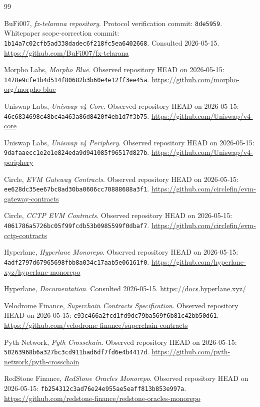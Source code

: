 \documentclass[11pt]{article}
\newcommand{\commithead}{\texttt{8de5959}}
\begin{document}
\begin{thebibliography}{99}

BuFi007, \textit{fx-telarana repository}. Protocol verification commit:
\commithead{}. Whitepaper scope-correction commit:
\texttt{1b14a7c02cfb5ad338dadec6f218fc5ea6402668}. Consulted 2026-05-15.
\url{https://github.com/BuFi007/fx-telarana}

Morpho Labs, \textit{Morpho Blue}. Observed repository HEAD on 2026-05-15:
\texttt{1478e9cfe1b4d514f80682b3b60e4e12ff3ee45a}.
\url{https://github.com/morpho-org/morpho-blue}

Uniswap Labs, \textit{Uniswap v4 Core}. Observed repository HEAD on
2026-05-15: \texttt{46c6834698c48bc4a463a86d8420f4eb1d7f3b75}.
\url{https://github.com/Uniswap/v4-core}

Uniswap Labs, \textit{Uniswap v4 Periphery}. Observed repository HEAD on
2026-05-15: \texttt{9dafaaecc1e2e1e824eda9d941085f96517d827b}.
\url{https://github.com/Uniswap/v4-periphery}

Circle, \textit{EVM Gateway Contracts}. Observed repository HEAD on
2026-05-15: \texttt{ee628dc35ee67bc8ad30ba0606cc70888688a3f1}.
\url{https://github.com/circlefin/evm-gateway-contracts}

Circle, \textit{CCTP EVM Contracts}. Observed repository HEAD on 2026-05-15:
\texttt{4061786a5726bc05f99fcdb53b0985599f0dbaf7}.
\url{https://github.com/circlefin/evm-cctp-contracts}

Hyperlane, \textit{Hyperlane Monorepo}. Observed repository HEAD on
2026-05-15: \texttt{4adf2797d67965698fbb8a034c17aab5e06161f0}.
\url{https://github.com/hyperlane-xyz/hyperlane-monorepo}

Hyperlane, \textit{Documentation}. Consulted 2026-05-15.
\url{https://docs.hyperlane.xyz/}

Velodrome Finance, \textit{Superchain Contracts Specification}. Observed
repository HEAD on 2026-05-15:
\texttt{c93c466a2fcd1fd9dc79ba569f6b81c42bb50d61}.
\url{https://github.com/velodrome-finance/superchain-contracts}

Pyth Network, \textit{Pyth Crosschain}. Observed repository HEAD on
2026-05-15: \texttt{50263968b6a327bc3cd911bad6df7fd6e4b4417d}.
\url{https://github.com/pyth-network/pyth-crosschain}

RedStone Finance, \textit{RedStone Oracles Monorepo}. Observed repository HEAD
on 2026-05-15: \texttt{fb254312c3ad76e24e955ae5eaff813b853e997a}.
\url{https://github.com/redstone-finance/redstone-oracles-monorepo}


\end{thebibliography}
\end{document}
